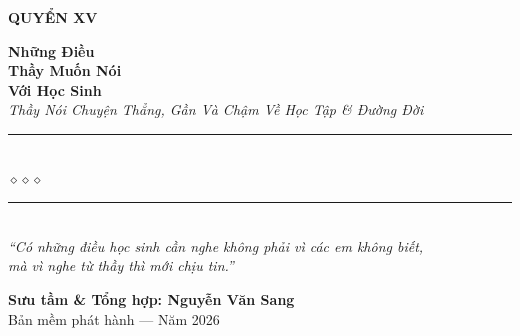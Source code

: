 \begin{titlepage}
\begin{center}
  \begin{tcolorbox}[
    width=6.5cm,
    colback=softcopper!20,
    colframe=softcopper!80!black,
    arc=4pt,
    boxrule=1.5pt,
    halign=center
  ]
    {\fontsize{18}{22}\selectfont\bfseries\color{deepblue!80!black}
     QUYỂN XV}
  \end{tcolorbox}
  \vspace{0.8cm}

  {\fontsize{28}{34}\selectfont\bfseries\color{deepblue!80!black}
    Những Điều}\\[0.4cm]
  {\fontsize{28}{34}\selectfont\bfseries\color{softcopper!80!black}
    Thầy Muốn Nói}\\[0.4cm]
  {\fontsize{28}{34}\selectfont\bfseries\color{deepblue!80!black}
    Với Học Sinh}\\[0.4cm]

  {\fontsize{16}{20}\selectfont\color{softcopper!90!black}\itshape
    Thầy Nói Chuyện Thẳng, Gần Và Chậm Về Học Tập \& Đường Đời}\\[1cm]

  {\color{earthink!60}\rule{6cm}{1pt}}\\[5pt]
  {\color{softcopper!80!black}\large$\diamond$\hspace{1cm}$\diamond$\hspace{1cm}$\diamond$}\\[5pt]
  {\color{earthink!60}\rule{6cm}{1pt}}\\[1.5cm]

  {\normalsize\itshape\color{earthink!90!black}
   ``Có những điều học sinh cần nghe không phải vì các em không biết,\\
   mà vì nghe từ thầy thì mới chịu tin.''}

  \vfill

  {\fontsize{16}{20}\selectfont\bfseries\color{earthink!90!black}
    Sưu tầm \& Tổng hợp: \textbf{Nguyễn Văn Sang}}\\[0.4cm]

  {\small\color{gray} Bản mềm phát hành --- Năm 2026}\\[0.5cm]
\end{center}

\afterpage{\nopagecolor}
\end{titlepage}